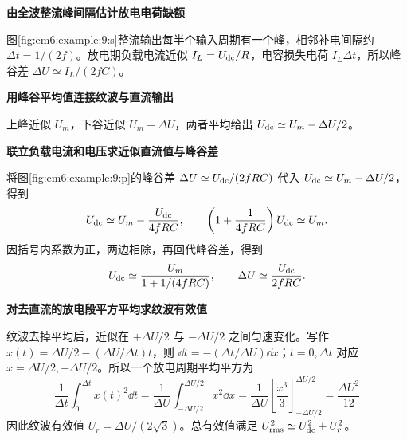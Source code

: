 \begin{solution}\textbf{由全波整流峰间隔估计放电电荷缺额}\par\nobreak
图\ref{fig:em6:example:9:s}整流输出每半个输入周期有一个峰，相邻补电间隔约 $\Delta t=1/(2f)$。放电期负载电流近似 $I_L=U_{\rm dc}/R$，电容损失电荷 $I_L\Delta t$，所以峰谷差 $\Delta U\simeq I_L/(2fC)$。

\par\medskip{}\noindent\textbf{用峰谷平均值连接纹波与直流输出}\par\nobreak
上峰近似 $U_m$，下谷近似 $U_m-\Delta U$，两者平均给出 $U_{\rm dc}\simeq U_m-\Delta U/2$。



\par\medskip{}\noindent\textbf{联立负载电流和电压求近似直流值与峰谷差}\par\nobreak
将图\ref{fig:em6:example:9:p}的峰谷差 $\Delta U\simeq U_{\rm dc}/(2fRC)$ 代入 $U_{\rm dc}\simeq U_m-\Delta U/2$，得到
\[
 U_{\rm dc}\simeq U_m-\frac{U_{\rm dc}}{4fRC},\qquad
 \left(1+\frac1{4fRC}\right)U_{\rm dc}\simeq U_m.
\]
因括号内系数为正，两边相除，再回代峰谷差，得到
\[U_{\rm dc}\simeq\frac{U_m}{1+1/(4fRC)},\qquad \Delta U\simeq\frac{U_{\rm dc}}{2fRC}.\]


\par\medskip{}\noindent\textbf{对去直流的放电段平方平均求纹波有效值}\par\nobreak
纹波去掉平均后，近似在 $+\Delta U/2$ 与 $-\Delta U/2$ 之间匀速变化。写作 $x(t)=\Delta U/2-(\Delta U/\Delta t)t$，则
$\dd t=-(\Delta t/\Delta U)\dd x$；$t=0,\Delta t$ 对应
$x=\Delta U/2,-\Delta U/2$。所以一个放电周期平均平方为
\[
 \frac1{\Delta t}\int_0^{\Delta t}x(t)^2\dd t
 =\frac1{\Delta U}\int_{-\Delta U/2}^{\Delta U/2}x^2\dd x
 =\frac1{\Delta U}\left[\frac{x^3}{3}\right]_{-\Delta U/2}^{\Delta U/2}
 =\frac{\Delta U^2}{12}
\]
因此纹波有效值 $U_{r}=\Delta U/(2\sqrt3)$。总有效值满足 $U_{\rm rms}^2\simeq U_{\rm dc}^2+U_r^2$。




\end{solution}
